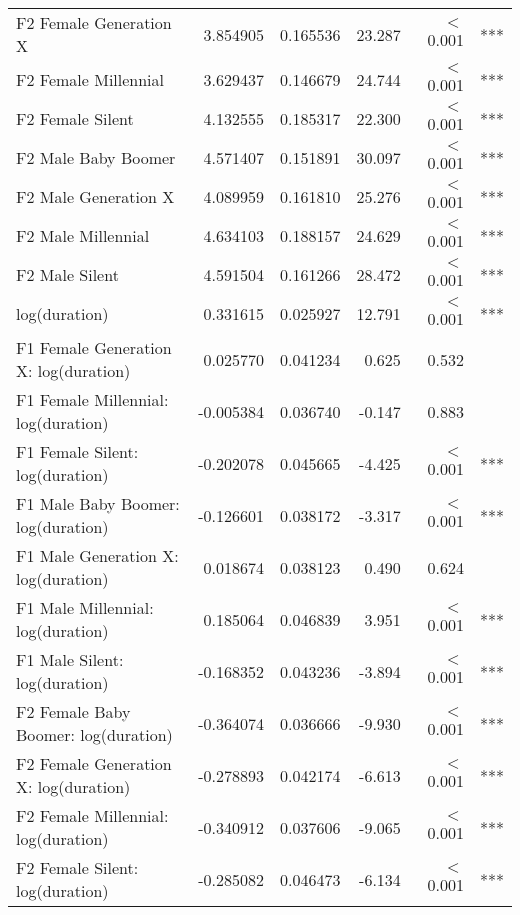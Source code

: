 \begin{table}[ht]
{{\begin{tabular}{l r r r r@{\hskip1pt} @{\hskip0pt}l }
    {}F2 Female Generation X                 &  3.854905  & 0.165536 & 23.287 & $<$ 0.001 & *** \\
    {}F2 Female Millennial           &  3.629437  & 0.146679 & 24.744 & $<$ 0.001 & *** \\
    {}F2 Female Silent               &  4.132555  & 0.185317 & 22.300 & $<$ 0.001 & *** \\
    {}F2 Male Baby Boomer               &  4.571407  & 0.151891 & 30.097 & $<$ 0.001 & *** \\
    {}F2 Male Generation X                 &  4.089959  & 0.161810 & 25.276 & $<$ 0.001 & *** \\
    {}F2 Male Millennial           &  4.634103  & 0.188157 & 24.629 & $<$ 0.001 & *** \\
    {}F2 Male Silent               &  4.591504  & 0.161266 & 28.472 & $<$ 0.001 & *** \\
    log(duration)                                        &  0.331615  & 0.025927 & 12.791 & $<$ 0.001 & *** \\
    {}F1 Female Generation X: log(duration)        &  0.025770  & 0.041234 &  0.625 &     0.532 &     \\
    {}F1 Female Millennial: log(duration)  & -0.005384  & 0.036740 & -0.147 &     0.883 &     \\
    {}F1 Female Silent: log(duration)      & -0.202078  & 0.045665 & -4.425 & $<$ 0.001 & *** \\
    {}F1 Male Baby Boomer: log(duration)      & -0.126601  & 0.038172 & -3.317 & $<$ 0.001 & *** \\
    {}F1 Male Generation X: log(duration)        &  0.018674  & 0.038123 &  0.490 &     0.624 &     \\
    {}F1 Male Millennial: log(duration)  &  0.185064  & 0.046839 &  3.951 & $<$ 0.001 & *** \\
    {}F1 Male Silent: log(duration)      & -0.168352  & 0.043236 & -3.894 & $<$ 0.001 & *** \\
    {}F2 Female Baby Boomer: log(duration)      & -0.364074  & 0.036666 & -9.930 & $<$ 0.001 & *** \\
    {}F2 Female Generation X: log(duration)        & -0.278893  & 0.042174 & -6.613 & $<$ 0.001 & *** \\
    {}F2 Female Millennial: log(duration)  & -0.340912  & 0.037606 & -9.065 & $<$ 0.001 & *** \\
    {}F2 Female Silent: log(duration)      & -0.285082  & 0.046473 & -6.134 & $<$ 0.001 & *** \\

\end{tabular}}}
\end{table}
